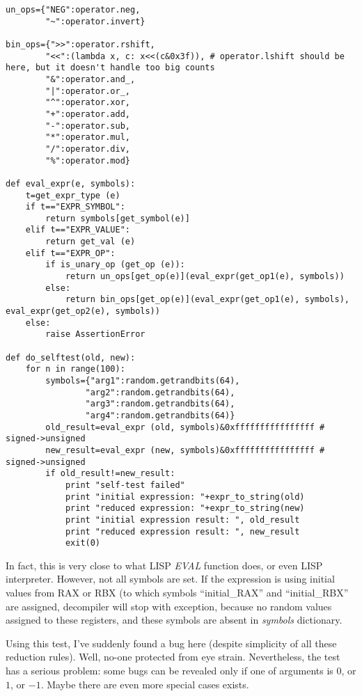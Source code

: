 \begin{lstlisting}
un_ops={"NEG":operator.neg,
        "~":operator.invert}

bin_ops={">>":operator.rshift,
        "<<":(lambda x, c: x<<(c&0x3f)), # operator.lshift should be here, but it doesn't handle too big counts
        "&":operator.and_,
        "|":operator.or_,
        "^":operator.xor,
        "+":operator.add,
        "-":operator.sub,
        "*":operator.mul,
        "/":operator.div,
        "%":operator.mod}

def eval_expr(e, symbols):
    t=get_expr_type (e)
    if t=="EXPR_SYMBOL":
        return symbols[get_symbol(e)]
    elif t=="EXPR_VALUE":
        return get_val (e)
    elif t=="EXPR_OP":
        if is_unary_op (get_op (e)):
            return un_ops[get_op(e)](eval_expr(get_op1(e), symbols))
        else:
            return bin_ops[get_op(e)](eval_expr(get_op1(e), symbols), eval_expr(get_op2(e), symbols))
    else:
        raise AssertionError

def do_selftest(old, new):
    for n in range(100):
        symbols={"arg1":random.getrandbits(64), 
                "arg2":random.getrandbits(64), 
                "arg3":random.getrandbits(64), 
                "arg4":random.getrandbits(64)}
        old_result=eval_expr (old, symbols)&0xffffffffffffffff # signed->unsigned
        new_result=eval_expr (new, symbols)&0xffffffffffffffff # signed->unsigned
        if old_result!=new_result:
            print "self-test failed"
            print "initial expression: "+expr_to_string(old)
            print "reduced expression: "+expr_to_string(new)
            print "initial expression result: ", old_result
            print "reduced expression result: ", new_result
            exit(0)
\end{lstlisting}

In fact, this is very close to what LISP \textit{EVAL} function does, or even LISP interpreter.
However, not all symbols are set.
If the expression is using initial values from RAX or RBX
(to which symbols ``initial\_RAX'' and ``initial\_RBX'' are assigned,
decompiler will stop with exception, because no random values assigned to these registers,
and these symbols are absent in \textit{symbols} dictionary.

Using this test, I've suddenly found a bug here (despite simplicity of all these reduction rules).
Well, no-one protected from eye strain.
Nevertheless, the test has a serious problem: some bugs can be revealed only if one of arguments is $0$, or $1$, or $-1$.
Maybe there are even more special cases exists.

